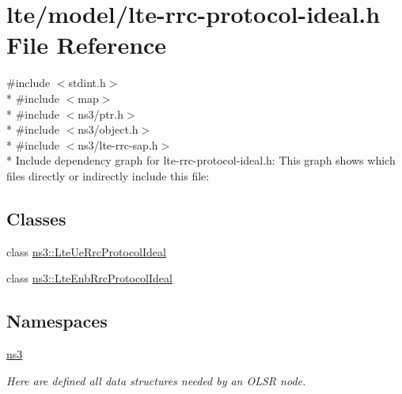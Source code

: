 \hypertarget{lte-rrc-protocol-ideal_8h}{}\section{lte/model/lte-\/rrc-\/protocol-\/ideal.h File Reference}
\label{lte-rrc-protocol-ideal_8h}
{\ttfamily \#include $<$stdint.\+h$>$}\\*
{\ttfamily \#include $<$map$>$}\\*
{\ttfamily \#include $<$ns3/ptr.\+h$>$}\\*
{\ttfamily \#include $<$ns3/object.\+h$>$}\\*
{\ttfamily \#include $<$ns3/lte-\/rrc-\/sap.\+h$>$}\\*
Include dependency graph for lte-\/rrc-\/protocol-\/ideal.h\+:
This graph shows which files directly or indirectly include this file\+:
\subsection*{Classes}
\begin{DoxyCompactItemize}
\item 
class \hyperlink{classns3_1_1LteUeRrcProtocolIdeal}{ns3\+::\+Lte\+Ue\+Rrc\+Protocol\+Ideal}
\item 
class \hyperlink{classns3_1_1LteEnbRrcProtocolIdeal}{ns3\+::\+Lte\+Enb\+Rrc\+Protocol\+Ideal}
\end{DoxyCompactItemize}
\subsection*{Namespaces}
\begin{DoxyCompactItemize}
\item 
 \hyperlink{namespacens3}{ns3}
\begin{DoxyCompactList}\small\item\em Here are defined all data structures needed by an O\+L\+SR node. \end{DoxyCompactList}\end{DoxyCompactItemize}

